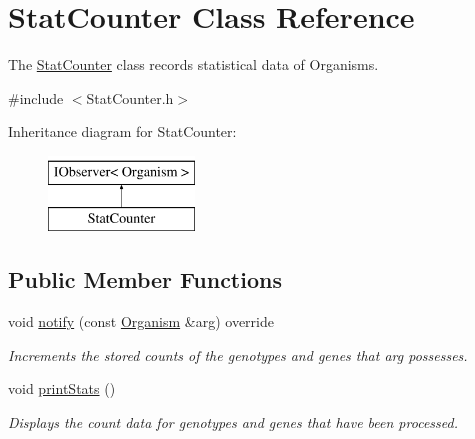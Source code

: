 \hypertarget{class_stat_counter}{}\section{Stat\+Counter Class Reference}
\label{class_stat_counter}


The \hyperlink{class_stat_counter}{Stat\+Counter} class records statistical data of Organisms.  




{\ttfamily \#include $<$Stat\+Counter.\+h$>$}

Inheritance diagram for Stat\+Counter\+:\begin{figure}[H]
\begin{center}
\leavevmode
\includegraphics[height=2.000000cm]{class_stat_counter}
\end{center}
\end{figure}
\subsection*{Public Member Functions}
\begin{DoxyCompactItemize}
\item 
\hypertarget{class_stat_counter_a81f82e98e35f1571565f2e1bc54de471}{}void \hyperlink{class_stat_counter_a81f82e98e35f1571565f2e1bc54de471}{notify} (const \hyperlink{class_organism}{Organism} \&arg) override\label{class_stat_counter_a81f82e98e35f1571565f2e1bc54de471}

\begin{DoxyCompactList}\small\item\em Increments the stored counts of the genotypes and genes that arg possesses. \end{DoxyCompactList}\item 
\hypertarget{class_stat_counter_ada1a2c28945b0bedd7840068e6cf770f}{}void \hyperlink{class_stat_counter_ada1a2c28945b0bedd7840068e6cf770f}{print\+Stats} ()\label{class_stat_counter_ada1a2c28945b0bedd7840068e6cf770f}

\begin{DoxyCompactList}\small\item\em Displays the count data for genotypes and genes that have been processed. \end{DoxyCompactList}\end{DoxyCompactItemize}



